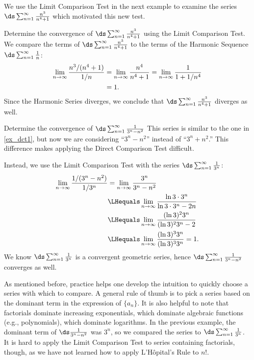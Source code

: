 We use the Limit Comparison Test in the next example to examine the series $\ds\sum_{n=1}^\infty \frac{n^3}{n^4+1}$ which motivated this new test.

\begin{example}\label{ex_lct1}
Determine the convergence of $\ds\sum_{n=1}^\infty \frac{n^3}{n^4+1}$ using the Limit Comparison Test.
\solution
We compare the terms of $\ds\sum_{n=1}^\infty \frac{n^3}{n^4+1}$ to the terms of the Harmonic Sequence $\ds\sum_{n=1}^\infty \frac1{n}$:
\begin{align*}
	\lim_{n\to\infty}\frac{{n^3}/(n^4+1)}{1/n}
	&= \lim_{n\to\infty} \frac{n^4}{n^4+1}= \lim_{n\to\infty} \frac{1}{1+1/n^4} \\
	&= 1.\vspace{-.5\baselineskip}
\end{align*}
Since the Harmonic Series diverges, we conclude that $\ds\sum_{n=1}^\infty \frac{n^3}{n^4+1}$ diverges as well.
\end{example}

\begin{example}\label{ex_lct2}
Determine the convergence of $\ds\sum_{n=1}^\infty \frac1{3^n-n^2}$
\solution
This series is similar to the one in \autoref{ex_dct1}, but now we are considering ``$3^n-n^2$'' instead of ``$3^n+n^2$.'' This difference makes applying the Direct Comparison Test difficult.

Instead, we use the Limit Comparison Test %
with the series $\ds\sum_{n=1}^\infty \frac1{3^n}$:
\begin{align*}
	\lim_{n\to\infty}\frac{1/(3^n-n^2)}{1/3^n}
	&= \lim_{n\to\infty}\frac{3^n}{3^n-n^2} \\
	& \LHequals \lim_{n\to\infty} \frac{\ln 3 \cdot 3^n}{\ln 3 \cdot 3^n -2n}\\
	& \LHequals \lim_{n\to\infty} \frac {(\ln 3)^2 3^n}{(\ln 3)^2 3^n -2}\\
	& \LHequals \lim_{n\to\infty} \frac {(\ln 3)^3 3^n}{(\ln 3)^3 3^n}=1.
\end{align*}
We know $\ds\sum_{n=1}^\infty \frac1{3^n}$ is a convergent geometric series, hence $\ds\sum_{n=1}^\infty \frac1{3^n-n^2}$ converges as well.
\end{example}

As mentioned before, practice helps one develop the intuition to quickly choose a series with which to compare. A general rule of thumb is to pick a series based on the dominant term in the expression of $\{a_n\}$. It is also helpful to note that factorials dominate increasing exponentials, which dominate algebraic functions (e.g., polynomials), which dominate logarithms. In the previous example, the dominant term of $\ds\frac{1}{3^n-n^2}$ was $3^n$, so we compared the series to $\ds \sum_{n=1}^\infty \frac1{3^n}$. It is hard to apply the Limit Comparison Test to series containing factorials, though, as we have not learned how to apply L'Hôpital's Rule to $n!$.


